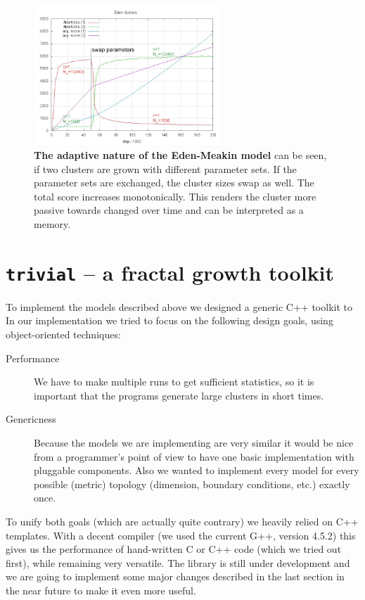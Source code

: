 \documentclass[twocolumn,10pt]{scrartcl}
\begin{document}
        \begin{figure}
            \center
            \includegraphics[width=7cm]{img/edenadap.png}
            \caption[The adaptive nature of the Eden-Meakin model]
                {\small\textbf{The adaptive nature of the Eden-Meakin model} can be seen, if two clusters are
                grown with different parameter sets. If the parameter sets are exchanged, the cluster sizes
                swap as well. The total score increases monotonically. This renders the cluster more passive
                towards changed over time and can be interpreted as a memory.}
            \label{fig-edenadap}
        \end{figure}

    \section{\lstinline!trivial! -- a fractal growth toolkit}
        To implement the models described above we designed a generic C++ toolkit to 
        In our implementation we tried to focus on the following design goals, using object-oriented techniques:
        \begin{description}
            \item[Performance] We have to make multiple runs to get sufficient statistics, so it is important that the
                programs generate large clusters in short times.
            \item[Genericness] Because the models we are implementing are very similar it would be nice from a
                programmer's point of view to have one basic implementation with pluggable components. Also we wanted to
                implement every model for every possible (metric) topology (dimension, boundary conditions, etc.)
                exactly once.
        \end{description}
        To unify both goals (which are actually quite contrary) we heavily relied on C++ templates. With a decent
        compiler (we used the current G++, version 4.5.2) this gives us the performance of hand-written C or C++ code
        (which we tried out first), while remaining very versatile. The library is still under development and we are
        going to implement some major changes described in the last section in the near future to make it even more
        useful.
\end{document}
